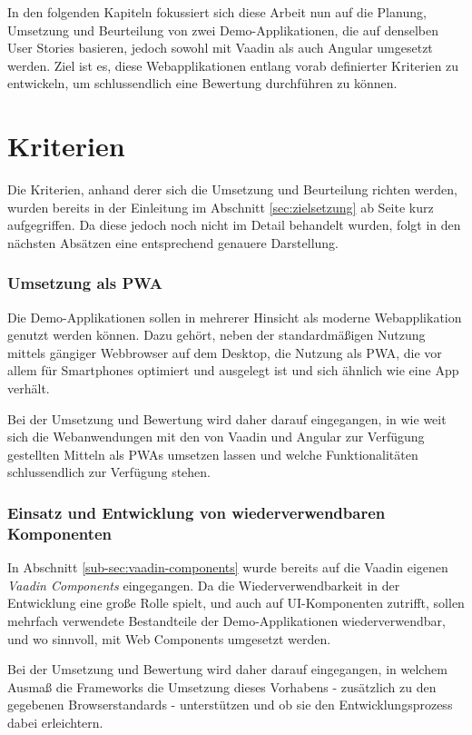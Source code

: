 \documentclass[a4paper,12pt,twoside]{scrreprt}
\begin{document}
In den folgenden Kapiteln fokussiert sich diese Arbeit nun auf die Planung, Umsetzung und Beurteilung von zwei Demo-Applikationen, die auf denselben User Stories basieren, jedoch sowohl mit Vaadin als auch Angular umgesetzt werden. Ziel ist es, diese Webapplikationen entlang vorab definierter Kriterien zu entwickeln, um schlussendlich eine Bewertung durchführen zu können.

\section{Kriterien}
\label{sec:kriterien}
Die Kriterien, anhand derer sich die Umsetzung und Beurteilung richten werden, wurden bereits in der Einleitung im Abschnitt \ref{sec:zielsetzung} ab Seite \pageref{sec:zielsetzung} kurz aufgegriffen. Da diese jedoch noch nicht im Detail behandelt wurden, folgt in den nächsten Absätzen eine entsprechend genauere Darstellung.

\subsubsection*{Umsetzung als \acl{PWA}}
\label{sub-sec:kriterien-pwa}
Die Demo-Applikationen sollen in mehrerer Hinsicht als moderne Webapplikation genutzt werden können. Dazu gehört, neben der standardmäßigen Nutzung mittels gängiger Webbrowser auf dem Desktop, die Nutzung als \ac{PWA}, die vor allem für Smartphones optimiert und ausgelegt ist und sich ähnlich wie eine App verhält.

Bei der Umsetzung und Bewertung wird daher darauf eingegangen, in wie weit sich die Webanwendungen mit den von Vaadin und Angular zur Verfügung gestellten Mitteln als \acp{PWA} umsetzen lassen und welche Funktionalitäten schlussendlich zur Verfügung stehen.

\subsubsection*{Einsatz und Entwicklung von wiederverwendbaren Komponenten}
\label{sub-sec:kriterien-web-components}
In Abschnitt \ref{sub-sec:vaadin-components} wurde bereits auf die Vaadin eigenen \textit{Vaadin Components} eingegangen. Da die Wiederverwendbarkeit in der Entwicklung eine große Rolle spielt, und auch auf \acs{UI}-Komponenten zutrifft, sollen mehrfach verwendete Bestandteile der Demo-Applikationen wiederverwendbar, und wo sinnvoll, mit Web Components umgesetzt werden.

Bei der Umsetzung und Bewertung wird daher darauf eingegangen, in welchem Ausmaß die Frameworks die Umsetzung dieses Vorhabens - zusätzlich zu den gegebenen Browserstandards - unterstützen und ob sie den Entwicklungsprozess dabei erleichtern.
\end{document}
